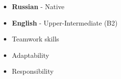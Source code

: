 
\twocolumnsection
{
\vspace{1em}
\begin{itemize}
   \item{} {\textbf{Russian}} - Native
   \item{} {\textbf{English}} - Upper-Intermediate (B2)
\end{itemize}}
{
\vspace{1em}
\begin{itemize}
   \item Teamwork skills
   \item Adaptability
   \item Responsibility
\end{itemize}}
